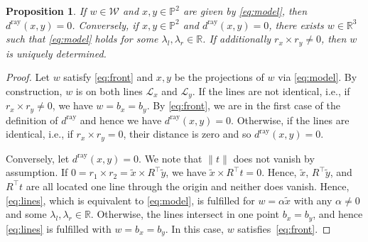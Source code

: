 \documentclass[10pt, twocolumn]{article}
\newtheorem{proposition}[theorem]{Proposition}
\theoremstyle{definition}
\newcommand{\R}{{\ensuremath{\mathbb{R}}}}
\begin{document}
\begin{proposition}
\label{prop:ray_distance_pseudo_definite_property}
    If $w\in\mathcal W$ and $x,y\in\mathbb P^2$ are given by \eqref{eq:model},
    then $d^\mathrm{ray}(x,y)=0$.
    Conversely, if $x,y\in\mathbb P^2$ and $d^\mathrm{ray}(x,y)=0$, 
    there exists $w\in\R^3$ such that \eqref{eq:model} holds for some $\lambda_l,\lambda_r\in\R$. 
    If additionally $r_x \times r_y \neq 0$, then $w$ is uniquely determined.
\end{proposition}
\begin{proof}
Let $w$ satisfy \eqref{eq:front} and $x,y$ be the projections of $w$ via \eqref{eq:model}. 
By construction, 
$w$ is on both lines $\mathcal L_x$ and $\mathcal L_y$.
If the lines are not identical, i.e., if $r_x\times r_y\neq0$, we have $w=b_x=b_y$.
By \eqref{eq:front}, we are in the first case of the definition of $d^\mathrm{ray}$ and hence we have $d^\mathrm{ray}(x,y)=0$.
Otherwise, if the lines are identical, i.e., if $r_x\times r_y=0$, their distance is zero and so $d^\mathrm{ray}(x,y)=0$.

Conversely, let $d^\mathrm{ray}(x,y)=0$.
We note that $\|t\|$ does not vanish by assumption.
If $0=r_1\times r_2 = \tilde x\times R^\top\tilde y$, we have $\tilde x\times R^\top t=0$.
Hence, $\tilde x$, $R^\top\tilde y$, and $R^\top t$ are all located one line through the origin and neither does vanish.
Hence, \eqref{eq:lines}, which is equivalent to \eqref{eq:model}, is fulfilled for $w=\alpha \tilde x$ with any $\alpha\neq0$ and some $\lambda_l,\lambda_r\in\R$.
Otherwise, the lines intersect in one point $b_x=b_y$, and hence \eqref{eq:lines} is fulfilled with $w=b_x=b_y$.
In this case, $w$ satisfies~\eqref{eq:front}.
\end{proof}
\end{document}
